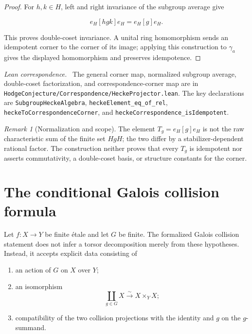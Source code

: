 \documentclass[11pt]{article}
\theoremstyle{definition}
\theoremstyle{remark}
\newtheorem*{remark}{Remark}
\newcommand{\leanpath}[1]{\texttt{\nolinkurl{#1}}}
\newcommand{\corrsrc}[1]{%
  \leanpath{HodgeConjecture/Correspondence/#1}}
\newenvironment{leanfiles}
  {\par\medskip\begingroup\footnotesize\raggedright\noindent
   \textit{Lean correspondence.}\ }
  {\par\endgroup\medskip}
\begin{document}
\begin{proof}
For \(h,k\in H\), left and right invariance of the subgroup average give

\[
  e_H[hgk]e_H=e_H[g]e_H.
\]

This proves double-coset invariance.  A unital ring homomorphism sends an
idempotent corner to the corner of its image; applying this construction to
\(\gamma_a\) gives the displayed homomorphism and preserves idempotence.
\end{proof}

\begin{leanfiles}
The general corner map, normalized subgroup average, double-coset
factorization, and correspondence-corner map are in
\corrsrc{HeckeProjector.lean}.  The key declarations are
\leanpath{SubgroupHeckeAlgebra}, \leanpath{heckeElement_eq_of_rel},
\leanpath{heckeToCorrespondenceCorner}, and
\leanpath{heckeCorrespondence_isIdempotent}.
\end{leanfiles}

\begin{remark}[Normalization and scope]
The element \(T_g=e_H[g]e_H\) is not the raw characteristic sum of the
finite set \(HgH\); the two differ by a stabilizer-dependent rational factor.
The construction neither proves that every \(T_g\) is idempotent nor asserts
commutativity, a double-coset basis, or structure constants for the corner.
\end{remark}

\section{The conditional Galois collision formula}
\label{sec:galois-collision}

Let \(f:X\to Y\) be finite \'etale and let \(G\) be finite.  The formalized
Galois collision statement does not infer a torsor decomposition merely from
these hypotheses.  Instead, it accepts explicit data consisting of

\begin{enumerate}[label=\textup{(\roman*)},leftmargin=2.6em]
  \item an action of \(G\) on \(X\) over \(Y\);
  \item an isomorphism
        \[
          \coprod_{g\in G}X\xrightarrow{\sim}X\times_YX;
        \]
  \item compatibility of the two collision projections with the identity
        and \(g\) on the \(g\)-summand.
\end{enumerate}
\end{document}
